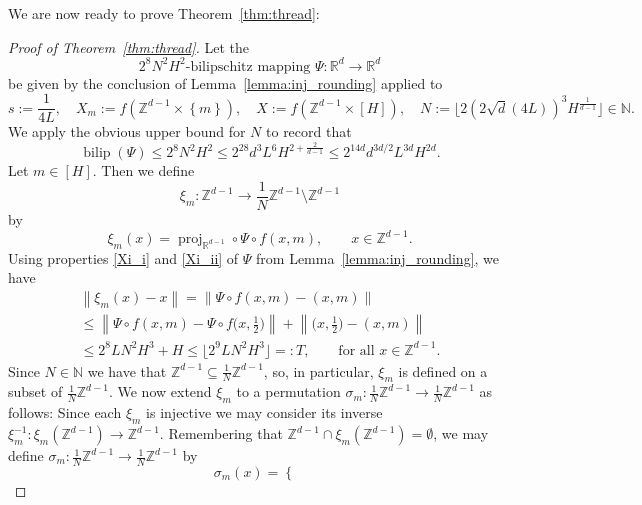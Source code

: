 \documentclass[a4paper, bibliography=totoc]{scrartcl}
\numberwithin{claimcounter}{define}
\newcommand{\R}{\mathbb{R}}
\newcommand{\Z}{\mathbb{Z}}
\newcommand{\N}{\mathbb{N}}
\newcommand{\floor}[1]{\lfloor#1\rfloor}
\newcommand{\bilip}{\operatorname{bilip}}
\DeclareMathOperator{\proj}{proj}
\newcommand{\enorm}[1]{\left\|#1\right\|}
\newcommand{\set}[1]{\left\{#1\right\}}
\newcommand{\br}[1]{\left(#1\right)}
\begin{document}
We are now ready to prove Theorem~\ref{thm:thread}:
\begin{proof}[Proof of Theorem~\ref{thm:thread}]
	Let the
	\begin{equation*}
	2^{8}N^{2}H^{2}\text{-bilipschitz mapping } \Psi\colon \R^{d}\to\R^{d}
	\end{equation*}
	be given by the conclusion of Lemma~\ref{lemma:inj_rounding} applied to 
	\begin{equation}\label{eq:setup}
	s:=\frac{1}{4L},\quad X_{m}:=f\br{\Z^{d-1}\times\set{m}},\quad  X:=f(\Z^{d-1}\times[H]), \quad N:=\floor{2(2\sqrt{d}(4L))^{3}H^{\frac{1}{d-1}}}\in\N.
	\end{equation}
	We apply the obvious upper bound for $N$ to record that
	\begin{equation}\label{eq:bPsi}
	\bilip(\Psi)\leq 2^{8}N^{2}H^{2}\leq 2^{28}d^{3}L^{6}H^{2+\frac{2}{d-1}}\leq 2^{14d}d^{3d/2}L^{3d}H^{2d}.
	\end{equation}
	Let $m\in [H]$. Then we define 
	\begin{equation*}
	\xi_{m}\colon \Z^{d-1}\to \frac{1}{N}\Z^{d-1}\setminus \Z^{d-1}
	\end{equation*}
	by
	\begin{equation*}
	\xi_{m}(x)=\proj_{\R^{d-1}}\circ \Psi\circ f(x,m),\qquad x\in \Z^{d-1}.
	\end{equation*}
	Using properties \eqref{Xi_i} and \eqref{Xi_ii} of $\Psi$ from Lemma~\ref{lemma:inj_rounding}, we have
	\begin{multline}\label{eq:xi-id}
	\enorm{\xi_{m}(x)-x}= \enorm{\Psi\circ f(x,m)-(x,m)}\\
	\leq \enorm{\Psi\circ f(x,m)-\Psi\circ f\biggl(x,\frac{1}{2}\biggr)}+\enorm{\biggl(x,\frac{1}{2}\biggr)-(x,m)}\\
	\leq 2^{8}LN^{2}H^{3}+H\leq \floor{2^{9}LN^{2}H^{3}}=:T, \qquad \text{for all $x\in \Z^{d-1}$.}
	\end{multline}
	Since $N\in\N$ we have that $\Z^{d-1}\subseteq \frac{1}{N}\Z^{d-1}$, so, in particular, $\xi_{m}$ is defined on a subset of $\frac{1}{N}\Z^{d-1}$. We now extend $\xi_{m}$ to a permutation $\sigma_{m}\colon \frac{1}{N}\Z^{d-1}\to \frac{1}{N}\Z^{d-1}$ as follows: Since each $\xi_{m}$ is injective we may consider its inverse $\xi_{m}^{-1}\colon \xi_{m}(\Z^{d-1})\to \Z^{d-1}$. Remembering that $\Z^{d-1}\cap \xi_{m}(\Z^{d-1})=\emptyset$, we may define $\sigma_{m}\colon \frac{1}{N}\Z^{d-1}\to \frac{1}{N}\Z^{d-1}$ by
	\begin{equation*}
	\sigma_{m}(x)=\begin{cases}

\end{cases}
\end{equation*}
\end{proof}
\end{document}
